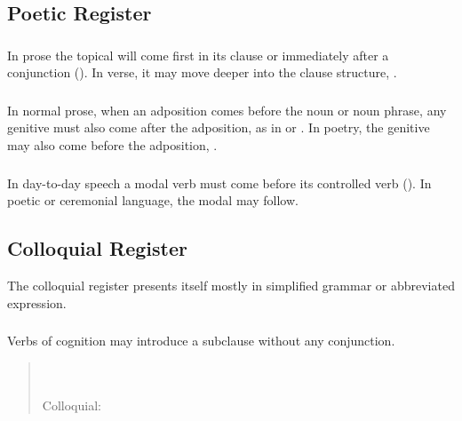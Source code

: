 \subsection{Poetic Register}

\subsubsection{} In prose the topical will come first in its clause or
immediately after a conjunction ().
In verse, it may move deeper into the clause structure,
 .

\subsubsection{} In normal prose, when an adposition comes before the
noun or noun phrase, any genitive must also come after the adposition,
as in  or  .  In
poetry, the genitive may also come before the adposition, . 

\subsubsection{} In day-to-day speech a modal verb must come before
its controlled verb ().  In poetic or
ceremonial language, the modal may follow.


\subsection{Colloquial Register} The colloquial register presents
itself mostly in simplified grammar or abbreviated expression.

\subsubsection{} Verbs of cognition may introduce a subclause without
any conjunction.

\begin{quotation}
\noindent{}\\
\noindent{}\\
\noindent Colloquial: 
\end{quotation}

